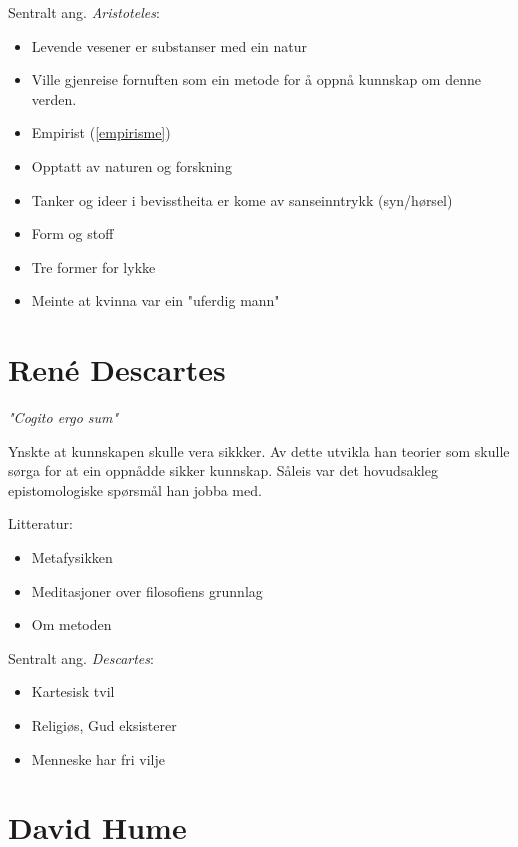 \documentclass[a4paper]{IEEEtran}
\begin{document}
Sentralt ang. \textit{Aristoteles}:
\begin{itemize}\bigskip
    \item Levende vesener er substanser med ein natur
    \item Ville gjenreise fornuften som ein metode for å oppnå kunnskap om denne verden.
    \item Empirist (\ref{empirisme})
    \item Opptatt av naturen og forskning
    \item Tanker og ideer i bevisstheita er kome av sanseinntrykk (syn/hørsel)
    \item Form og stoff 
    \item Tre former for lykke
    \item Meinte at kvinna var ein "uferdig mann"
    
\end{itemize}\bigskip


\bigskip
\section{René Descartes}
\label{descartes}\bigskip
\begin{center}
    \textit{"Cogito ergo sum"}\bigskip    
\end{center}


Ynskte at kunnskapen skulle vera sikkker. Av dette utvikla han teorier som skulle sørga for at ein oppnådde sikker kunnskap. Såleis var det hovudsakleg epistomologiske spørsmål han jobba med.

\bigskip
Litteratur:
\begin{itemize}
    \item Metafysikken
    \item Meditasjoner over filosofiens grunnlag
    \item Om metoden
\end{itemize}\bigskip 

Sentralt ang. \textit{Descartes}:
\begin{itemize}\bigskip
    \item Kartesisk tvil
    \item Religiøs, Gud eksisterer
    \item Menneske har fri vilje
\end{itemize}\bigskip

\section{David Hume}
\label{hume}\bigskip
\end{document}

